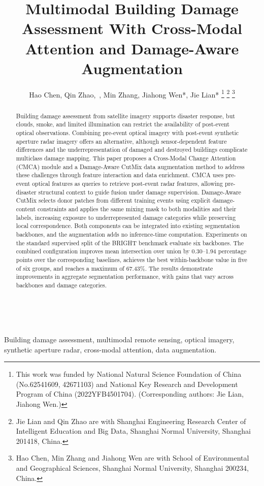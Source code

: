 \documentclass[journal]{IEEEtran}
\begin{document}
    
    \title{Multimodal Building Damage Assessment With Cross-Modal Attention and Damage-Aware Augmentation}
    
    \author{Hao Chen, Qin Zhao,~, Min Zhang, Jiahong Wen*, Jie Lian*
    \thanks{This work was funded by National Natural Science Foundation of China (No.62541609, 42671103) and National Key Research and Development Program of China (2022YFB4501704). (Corresponding authors: Jie Lian, Jiahong Wen.)}%
    \thanks{Jie Lian and Qin Zhao are with Shanghai Engineering Research Center of Intelligent Education and
    Big Data, Shanghai Normal University, Shanghai 201418, China.}
    \thanks{Hao Chen, Min Zhang and Jiahong Wen are with School of Environmental and Geographical Sciences, Shanghai Normal University, Shanghai 200234, China.}
    }
    
    \maketitle
    
    \begin{abstract}
    Building damage assessment from satellite imagery supports disaster response, but clouds, smoke, and limited illumination can restrict the availability of post-event optical observations. Combining pre-event optical imagery with post-event synthetic aperture radar imagery offers an alternative, although sensor-dependent feature differences and the underrepresentation of damaged and destroyed buildings complicate multiclass damage mapping. This paper proposes a Cross-Modal Change Attention (CMCA) module and a Damage-Aware CutMix data augmentation method to address these challenges through feature interaction and data enrichment. CMCA uses pre-event optical features as queries to retrieve post-event radar features, allowing pre-disaster structural context to guide fusion under damage supervision. Damage-Aware CutMix selects donor patches from different training events using explicit damage-content constraints and applies the same mixing mask to both modalities and their labels, increasing exposure to underrepresented damage categories while preserving local correspondence. Both components can be integrated into existing segmentation backbones, and the augmentation adds no inference-time computation. Experiments on the standard supervised split of the BRIGHT benchmark evaluate six backbones. The combined configuration improves mean intersection over union by 0.30–1.94 percentage points over the corresponding baselines, achieves the best within-backbone value in five of six groups, and reaches a maximum of 67.43\%. The results demonstrate improvements in aggregate segmentation performance, with gains that vary across backbones and damage categories.
    \end{abstract}
    ~
    \begin{IEEEkeywords}
    Building damage assessment, multimodal remote sensing, optical imagery, synthetic aperture radar, cross-modal attention, data augmentation.
    \end{IEEEkeywords}
    
\end{document}
